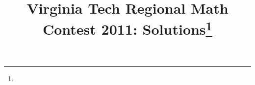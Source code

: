 \documentclass[10pt]{article}
\begin{document}
\title{Virginia Tech Regional Math Contest 2011: Solutions\footnote{\disclaimer}}
\author{\vspace{-2ex}}
\date{\vspace{-5ex}} %
\maketitle

%

%

%

%

%

%

%
\end{document}

